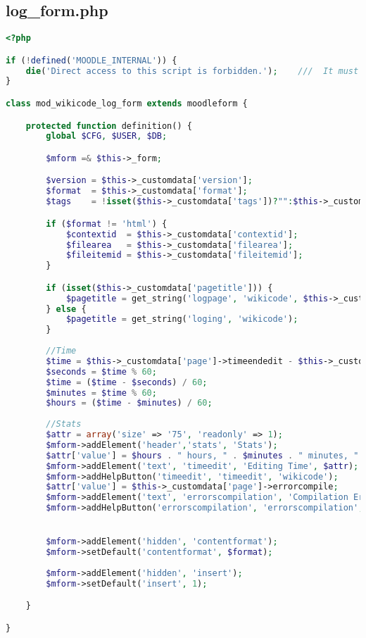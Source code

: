 \subsection{log\_form.php}
\begin{lstlisting}[language=PHP]
<?php

if (!defined('MOODLE_INTERNAL')) {
    die('Direct access to this script is forbidden.');    ///  It must be included from a Moodle page
}

class mod_wikicode_log_form extends moodleform {

    protected function definition() {
        global $CFG, $USER, $DB;

        $mform =& $this->_form;

        $version = $this->_customdata['version'];
        $format  = $this->_customdata['format'];
        $tags    = !isset($this->_customdata['tags'])?"":$this->_customdata['tags'];

        if ($format != 'html') {
            $contextid  = $this->_customdata['contextid'];
            $filearea   = $this->_customdata['filearea'];
            $fileitemid = $this->_customdata['fileitemid'];
        }

        if (isset($this->_customdata['pagetitle'])) {
            $pagetitle = get_string('logpage', 'wikicode', $this->_customdata['pagetitle']);
        } else {
            $pagetitle = get_string('loging', 'wikicode');
        }
		
		//Time
		$time = $this->_customdata['page']->timeendedit - $this->_customdata['page']->timestartedit;
		$seconds = $time % 60;
		$time = ($time - $seconds) / 60;
		$minutes = $time % 60;
		$hours = ($time - $minutes) / 60;		
		
		//Stats
		$attr = array('size' => '75', 'readonly' => 1);
		$mform->addElement('header','stats', 'Stats');
		$attr['value'] = $hours . " hours, " . $minutes . " minutes, " . $seconds . " seconds";
		$mform->addElement('text', 'timeedit', 'Editing Time', $attr);
		$mform->addHelpButton('timeedit', 'timeedit', 'wikicode');
		$attr['value'] = $this->_customdata['page']->errorcompile;
		$mform->addElement('text', 'errorscompilation', 'Compilation Errors', $attr);
		$mform->addHelpButton('errorscompilation', 'errorscompilation', 'wikicode');


        $mform->addElement('hidden', 'contentformat');
        $mform->setDefault('contentformat', $format);
		
		$mform->addElement('hidden', 'insert');
		$mform->setDefault('insert', 1);

    }

}
\end{lstlisting}

